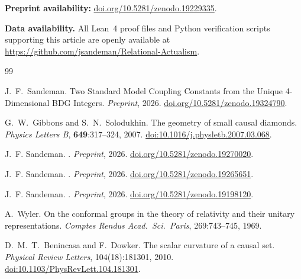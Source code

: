 \documentclass[11pt,a4paper]{article}
\begin{document}
\textbf{Preprint availability:} \href{https://doi.org/10.5281/zenodo.19229335}{doi.org/10.5281/zenodo.19229335}.


\smallskip\noindent
\textbf{Data availability.}
All Lean~4 proof files and Python verification scripts supporting this
article are openly available at
\url{https://github.com/jsandeman/Relational-Actualism}.

\begin{thebibliography}{99}

J.~F.~Sandeman.
\newblock Two Standard Model Coupling Constants from the Unique 4-Dimensional
  BDG Integers.
\newblock \textit{Preprint}, 2026.
\newblock \href{https://doi.org/10.5281/zenodo.19324790}{doi.org/10.5281/zenodo.19324790}.

G.~W.~Gibbons and S.~N.~Solodukhin.
\newblock The geometry of small causal diamonds.
\newblock \textit{Physics Letters B}, \textbf{649}:317--324, 2007.
\newblock \href{https://doi.org/10.1016/j.physletb.2007.03.068}{doi:10.1016/j.physletb.2007.03.068}.

J.~F. Sandeman.
.
\newblock \textit{Preprint}, 2026.
\newblock \href{https://doi.org/10.5281/zenodo.19270020}{doi.org/10.5281/zenodo.19270020}.


J.~F. Sandeman.
.
\newblock \textit{Preprint}, 2026.
\newblock \href{https://doi.org/10.5281/zenodo.19265651}{doi.org/10.5281/zenodo.19265651}.

J.~F. Sandeman.
.
\newblock \textit{Preprint}, 2026.
\newblock \href{https://doi.org/10.5281/zenodo.19198120}{doi.org/10.5281/zenodo.19198120}.


A.~Wyler.
\newblock On the conformal groups in the theory of relativity and their
  unitary representations.
\newblock \emph{Comptes Rendus Acad.~Sci.~Paris}, 269:743--745, 1969.

D.~M.~T.~Benincasa and F.~Dowker.
\newblock The scalar curvature of a causal set.
\newblock \emph{Physical Review Letters}, 104(18):181301, 2010.
\newblock \href{https://doi.org/10.1103/PhysRevLett.104.181301}{doi:10.1103/PhysRevLett.104.181301}.


\end{thebibliography}
\end{document}
